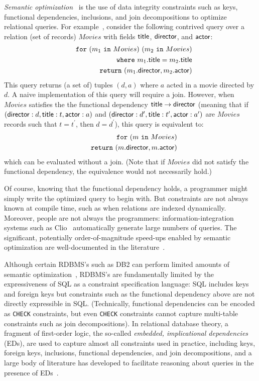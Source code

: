 \documentclass[preprint]{sigplanconf}
\newcommand{\FOR}{{\tt for} \ }
\newcommand{\WHERE}{{\tt where} \ }
\newcommand{\IN}{ \ {\tt in} \ }
\newcommand{\RETURN}{{\tt return} \ }
\begin{document}
{\it Semantic optimization}~\cite{foundations,Deutsch:2006:QRC:1121995.1122010,Popa99anequational} is the 
use of data integrity constraints such as keys, functional dependencies, inclusions, and join decompositions to optimize relational queries. For example~\cite{foundations}, consider the following contrived query over a relation (set of records) $Movies$ 
with fields ${\sf title}$, ${\sf director}$, and ${\sf actor}$:
\begin{eqnarray*}
& & \FOR (m_1 \IN Movies) \ (m_2 \IN Movies) \\
 & & \WHERE m_1.{\sf title} = m_2.{\sf title} \\
 & & \RETURN (m_1.{\sf director}, m_2.{\sf actor})
\end{eqnarray*}        
This query returns (a set of) tuples $(d,a)$ where $a$ acted in a movie directed by $d
$.  A naive implementation of this query will require a join.  However, when $Movies$ 
satisfies the the functional dependency ${\sf title} \to {\sf director}$ (meaning that 
if $({\sf director}: d, {\sf title}: t, {\sf actor}: a)$ and $({\sf director}: d^\prime, {\sf title}: t^\prime, {\sf actor}: a^\prime)$ are $Movies$ records such that $t = t^\prime$, then $d = d^\prime$), this query is equivalent to:
\begin{eqnarray*}
& & \FOR (m \IN Movies) \\
 & & \RETURN (m.{\sf director}, m.{\sf actor})
 \end{eqnarray*}
which can be evaluated without a join.  (Note that if $Movies$ did not satisfy the functional dependency, the equivalence would not necessarily hold.)  

Of course, knowing that the functional dependency holds, a programmer might simply write the optimized query to begin with.  But constraints are not always known at compile time, such as when relations are indexed dynamically.  Moreover, people are not always the programmers: information-integration systems such as Clio~\cite{haas:clio} automatically generate large numbers of queries.  The significant, potentially order-of-magnitude speed-ups enabled by semantic optimization are well-documented in the literature~\cite{Cheng:1999:ITS:645925.671357}.  

Although certain RDBMS's such as DB2 can perform limited amounts of semantic optimization~\cite{Cheng:1999:ITS:645925.671357}, RDBMS's are fundamentally limited by the expressiveness of SQL as a constraint specification language: SQL includes keys and foreign keys but constraints such as the functional dependency above are not directly expressible in SQL.  (Technically, functional dependencies can be encoded as {\tt CHECK} constraints, but even {\tt CHECK} constraints cannot capture multi-table constraints such as join decompositions).  In relational database theory, a fragment of first-order logic, the so-called {\it embedded, implicational dependencies} (EDs), are used to capture almost all constraints used in practice, including keys, foreign keys, inclusions, functional dependencies, and join decompositions, and a large body of literature has developed to facilitate reasoning about queries in the presence of EDs~\cite{Popa99anequational}. 
\end{document}
